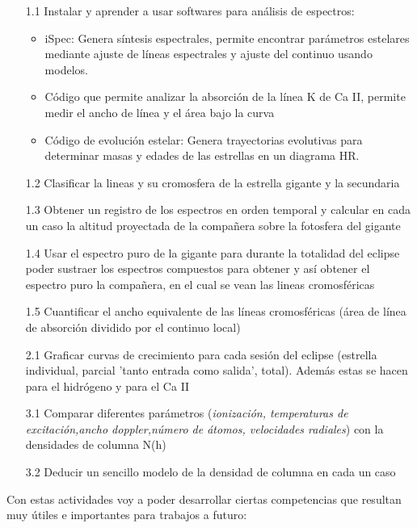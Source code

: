 \documentclass[11pt]{article}
\begin{document}
\begin{itemize}

\item[1.1] Instalar y aprender a usar softwares para análisis de espectros:
\begin{itemize}
    \item iSpec: Genera síntesis espectrales, permite encontrar parámetros estelares mediante ajuste de líneas espectrales y ajuste del continuo usando modelos.
    \item Código que permite analizar la absorción de la línea K de Ca II, permite medir el ancho de línea y el área bajo la curva
    \item Código de evolución estelar: Genera trayectorias evolutivas para determinar masas y edades de las estrellas en un diagrama HR.
\end{itemize}
\item[1.2] Clasificar la lineas y su cromosfera de la estrella gigante y la secundaria
\item[1.3] Obtener un registro de los espectros en orden temporal y calcular en cada un caso la altitud proyectada de la compañera sobre la fotosfera del gigante

\item[1.4]  Usar el espectro puro de la gigante para durante la totalidad del eclipse poder sustraer los espectros compuestos para obtener y así obtener el espectro puro la compañera, en el cual se vean las lineas cromosféricas

\item[1.5] Cuantificar el ancho equivalente de las líneas cromosféricas (área de línea de absorción dividido por el continuo local)

\item[2.1] Graficar curvas de crecimiento para cada sesión del eclipse (estrella individual, parcial 'tanto entrada como salida', total). Además estas se hacen para el hidrógeno y para el Ca II 

\item[3.1] Comparar diferentes parámetros (\textit{ionización, temperaturas de excitación,ancho doppler,número de átomos, velocidades radiales}) con la densidades de columna N(h)

\item[3.2] Deducir un sencillo modelo de la densidad de columna en cada un caso

 
\end{itemize}

Con estas actividades voy a poder desarrollar ciertas competencias que resultan muy útiles e importantes para trabajos a futuro:
\end{document}
